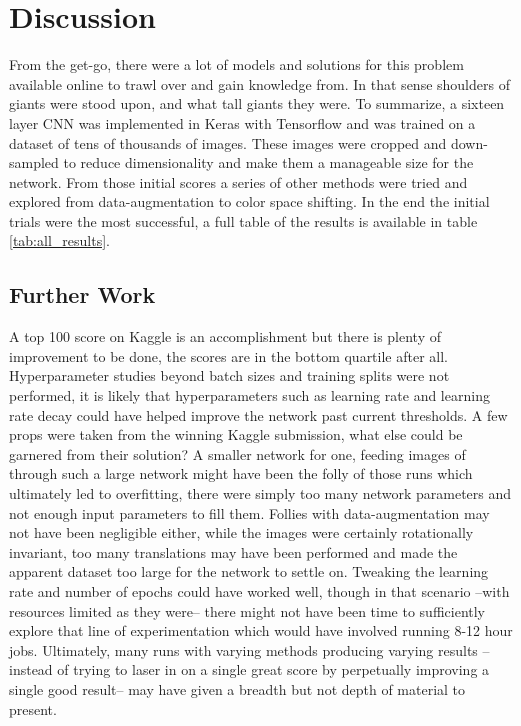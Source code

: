 \section{Discussion}

From the get-go, there were a lot of models and solutions for this problem available online to trawl over and gain knowledge from. In that sense shoulders of giants were stood upon, and what tall giants they were. To summarize, a sixteen layer CNN was implemented in Keras with Tensorflow and was trained on a dataset of tens of thousands of images. These images were cropped and down-sampled to reduce dimensionality and make them a manageable size for the network. From those initial scores a series of other methods were tried and explored from data-augmentation to color space shifting. In the end the initial trials were the most successful, a full table of the results is available in table \ref{tab:all_results}.

\subsection{Further Work}
A top 100 score on Kaggle is an accomplishment but there is plenty of improvement to be done, the scores are in the bottom quartile after all. Hyperparameter studies beyond batch sizes and training splits were not performed, it is likely that hyperparameters such as learning rate and learning rate decay could have helped improve the network past current thresholds. A few props were taken from the winning Kaggle submission, what else could be garnered from their solution? A smaller network for one, feeding images of  through such a large network might have been the folly of those runs which ultimately led to overfitting, there were simply too many network parameters and not enough input parameters to fill them. Follies with data-augmentation may not have been negligible either, while the images were certainly rotationally invariant, too many translations may have been performed and made the apparent dataset too large for the network to settle on. Tweaking the learning rate and number of epochs could have worked well, though in that scenario --with resources limited as they were-- there might not have been time to sufficiently explore that line of experimentation which would have involved running 8-12 hour jobs. Ultimately, many runs with varying methods producing varying results --instead of trying to laser in on a single great score by perpetually improving a single good result-- may have given a breadth but not depth of material to present.

